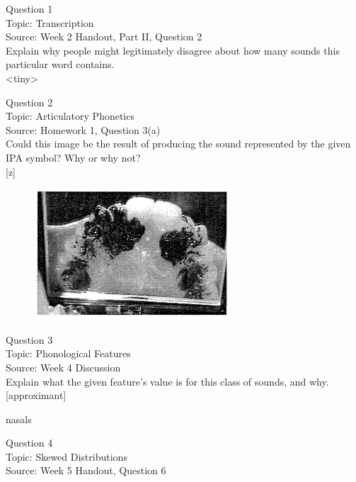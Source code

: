 \documentclass[12pt]{article}
\begin{document}
{\large Question 1}\\

Topic: Transcription\\
Source: Week 2 Handout, Part II, Question 2\\

Explain why people might legitimately disagree about how many sounds this particular word contains.\\

<tiny>


\newpage

{\large Question 2}\\

Topic: Articulatory Phonetics\\
Source: Homework 1, Question 3(a)\\

Could this image be the result of producing the sound represented by the given IPA symbol? Why or why not?\\

{[z]}

\begin{figure}[H]
\includegraphics{../images/staticpalatography_fricative.png}
\end{figure}

\newpage

{\large Question 3}\\

Topic: Phonological Features\\
Source: Week 4 Discussion\\

Explain what the given feature’s value is for this class of sounds, and why.\\

{[approximant]}

nasals


\newpage

{\large Question 4}\\

Topic: Skewed Distributions\\
Source: Week 5 Handout, Question 6\\
\end{document}
